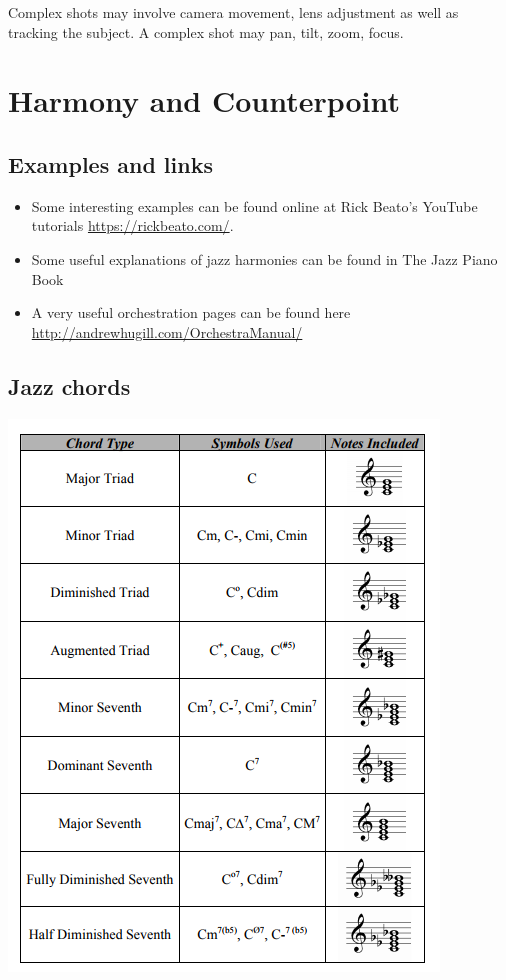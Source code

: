 Complex shots may involve camera movement, lens adjustment as well as tracking the subject. A complex shot may pan, tilt, zoom, focus. 

\section{Harmony and Counterpoint}
\subsection{Examples and links}
\begin{itemize}
\item Some interesting examples can be found online at Rick Beato's YouTube tutorials \url{https://rickbeato.com/}. 
\item Some useful explanations of jazz harmonies can be found in The Jazz Piano Book \citep{levine2011jazz}
\item A very useful orchestration pages can be found here \url{http://andrewhugill.com/OrchestraManual/}
\end{itemize}

\subsection{Jazz chords}
\includegraphics[scale=2.0]{jazzchords} 

